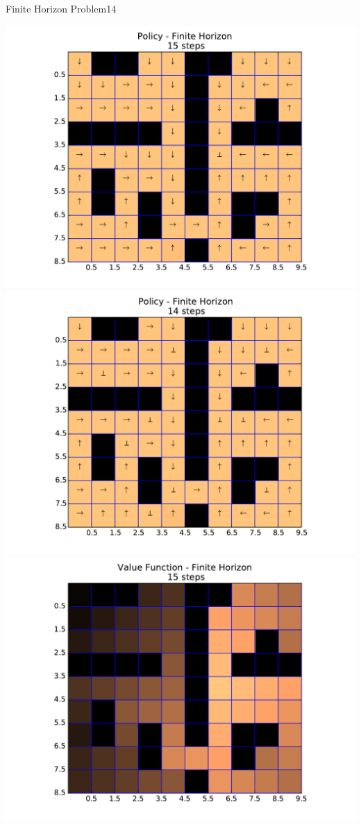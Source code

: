 \begin{questions}
\begin{question}{Finite Horizon Problem}{14}
\begin{answer}
	\includegraphics[scale=0.4]{Gridworld/policy_Fin_15.pdf}
	\includegraphics[scale=0.4]{Gridworld/policy_Fin_14.pdf}\\
	\includegraphics[scale=0.8]{Gridworld/value_Fin_15.pdf} 



\end{answer}
\end{question}
\end{questions}
